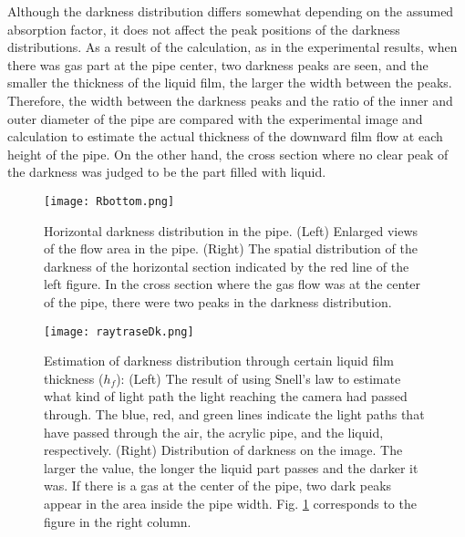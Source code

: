 \documentclass[aps,pre,preprint,groupedaddress,showkeys]{revtex4-2}
\begin{document}
Although the darkness distribution differs somewhat depending on the assumed absorption factor, it does not affect the peak positions of the darkness distributions.
As a result of the calculation, as in the experimental results, when there was gas part at the pipe center, two darkness peaks are seen, and the smaller the thickness of the liquid film, the larger the width between the peaks.
Therefore, the width between the darkness peaks and the ratio of the inner and outer diameter of the pipe are compared with the experimental image and calculation to estimate the actual thickness of the downward film flow at each height of the pipe.
On the other hand, the cross section where no clear peak of the darkness was judged to be the part filled with liquid.

\begin{figure}
\texttt{[image: Rbottom.png]} 
\caption{\label{Rbottom} Horizontal darkness distribution in the pipe.
(Left) Enlarged views of the flow area in the pipe.
(Right) The spatial distribution of the darkness of the horizontal section indicated by the red line of the left figure.
In the cross section where the gas flow was at the center of the pipe, there were two peaks in the darkness distribution.}
\end{figure}

\begin{figure}
\texttt{[image: raytraseDk.png]} 
\caption{\label{raytraseDk}Estimation of darkness distribution through certain liquid film thickness ($ h_f $):
(Left) The result of using Snell's law to estimate what kind of light path the light reaching the camera had passed through.
The blue, red, and green lines indicate the light paths that have passed through the air, the acrylic pipe, and the liquid, respectively.
(Right) Distribution of darkness on the image.
The larger the value, the longer the liquid part passes and the darker it was.
If there is a gas at the center of the pipe, two dark peaks appear in the area inside the pipe width.
Fig. \ref{Rbottom} corresponds to the figure in the right column.}
\end{figure}
\end{document}
